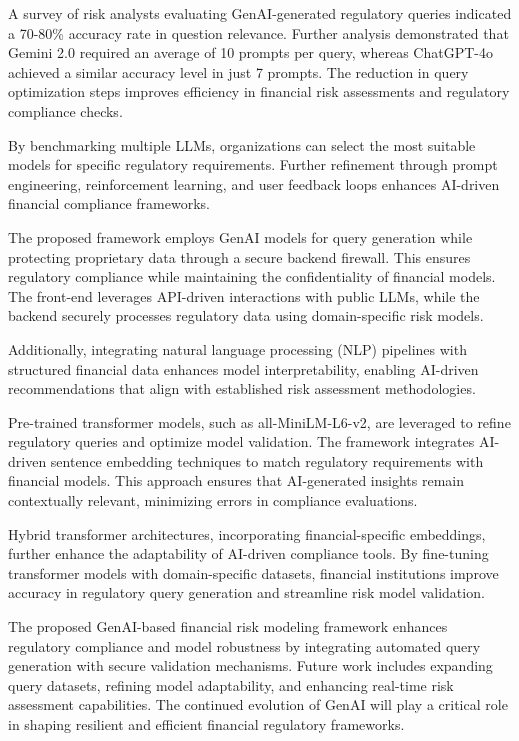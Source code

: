 \documentclass[a4paper,headinclude=on,footinclude=on,12pt,oneside]{scrbook}
\begin{document}
	A survey of risk analysts evaluating GenAI-generated regulatory queries indicated a 70-80\% accuracy rate in question relevance. Further analysis demonstrated that Gemini 2.0 required an average of 10 prompts per query, whereas ChatGPT-4o achieved a similar accuracy level in just 7 prompts. The reduction in query optimization steps improves efficiency in financial risk assessments and regulatory compliance checks.
	
	By benchmarking multiple LLMs, organizations can select the most suitable models for specific regulatory requirements. Further refinement through prompt engineering, reinforcement learning, and user feedback loops enhances AI-driven financial compliance frameworks.
	
	
	The proposed framework employs GenAI models for query generation while protecting proprietary data through a secure backend firewall. This ensures regulatory compliance while maintaining the confidentiality of financial models. The front-end leverages API-driven interactions with public LLMs, while the backend securely processes regulatory data using domain-specific risk models.
	
	Additionally, integrating natural language processing (NLP) pipelines with structured financial data enhances model interpretability, enabling AI-driven recommendations that align with established risk assessment methodologies.
	
	Pre-trained transformer models, such as all-MiniLM-L6-v2, are leveraged to refine regulatory queries and optimize model validation. The framework integrates AI-driven sentence embedding techniques to match regulatory requirements with financial models. This approach ensures that AI-generated insights remain contextually relevant, minimizing errors in compliance evaluations.
	
	Hybrid transformer architectures, incorporating financial-specific embeddings, further enhance the adaptability of AI-driven compliance tools. By fine-tuning transformer models with domain-specific datasets, financial institutions improve accuracy in regulatory query generation and streamline risk model validation.
	
	The proposed GenAI-based financial risk modeling framework enhances regulatory compliance and model robustness by integrating automated query generation with secure validation mechanisms. Future work includes expanding query datasets, refining model adaptability, and enhancing real-time risk assessment capabilities. The continued evolution of GenAI will play a critical role in shaping resilient and efficient financial regulatory frameworks.
	
\end{document}
